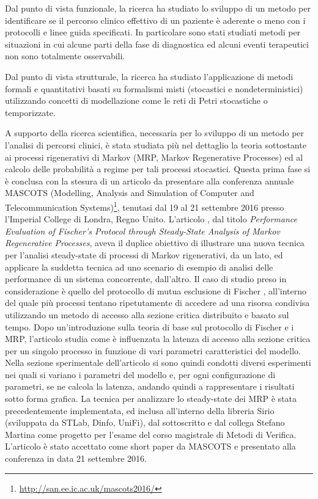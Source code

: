 \documentclass{article}
\begin{document}
    Dal punto di vista funzionale, la ricerca ha studiato lo sviluppo di un metodo per identificare se il percorso clinico effettivo di un paziente è aderente o meno con i protocolli e linee guida specificati. In particolare sono stati studiati metodi per situazioni in cui alcune parti della fase di diagnostica ed alcuni eventi terapeutici non sono totalmente osservabili.
    
    Dal punto di vista strutturale, la ricerca ha studiato l'applicazione di metodi formali e quantitativi basati su formalismi misti (stocastici e nondeterministici) utilizzando concetti di modellazione come le reti di Petri stocastiche o temporizzate.
    
    A supporto della ricerca scientifica, necessaria per lo sviluppo di un metodo per l'analisi di percorsi clinici, è stata studiata più nel dettaglio la teoria sottostante ai processi rigenerativi di Markov (MRP, Markov Regenerative Processes) ed al calcolo delle probabilità a regime per tali processi stocastici. Questa prima fase si è conclusa con la stesura di un articolo da presentare alla conferenza annuale MASCOTS (Modelling, Analysis and Simulation of Computer and Telecommunication Systems)\footnote{\url{http://san.ee.ic.ac.uk/mascots2016/}}, tenutasi dal 19 al 21 settembre 2016 presso l'Imperial College di Londra, Regno Unito. L'articolo \cite{mascots16}, dal titolo \textit{Performance Evaluation of Fischer's Protocol through Steady-State Analysis of Markov Regenerative Processes}, aveva il duplice obiettivo di illustrare una nuova tecnica per l'analisi steady-state di processi di Markov rigenerativi, da un lato, ed applicare la suddetta tecnica ad uno scenario di esempio di analisi delle performance di un sistema concorrente, dall'altro. Il caso di studio preso in considerazione è quello del protocollo di mutua esclusione di Fischer \cite{fischer85}, all'interno del quale più processi tentano ripetutamente di accedere ad una risorsa condivisa utilizzando un metodo di accesso alla sezione critica distribuito e basato sul tempo. Dopo un'introduzione sulla teoria di base sul protocollo di Fischer e i MRP, l'articolo studia come è influenzata la latenza di accesso alla sezione critica per un singolo processo in funzione di vari parametri caratteristici del modello. Nella sezione sperimentale dell'articolo si sono quindi condotti diversi esperimenti nei quali si variano i parametri del modello e, per ogni configurazione di parametri, se ne calcola la latenza, andando quindi a rappresentare i risultati sotto forma grafica. La tecnica per analizzare lo steady-state dei MRP è stata precedentemente implementata, ed inclusa all'interno della libreria Sirio (sviluppata da STLab, Dinfo, UniFi), dal sottoscritto e dal collega Stefano Martina come progetto per l'esame del corso magistrale di Metodi di Verifica. L'articolo è stato accettato come short paper da MASCOTS e presentato alla conferenza in data 21 settembre 2016.
    
\end{document}
